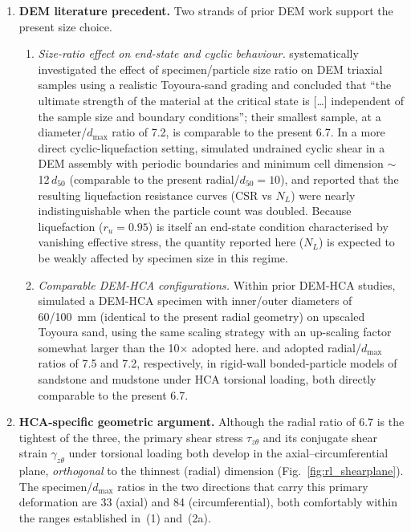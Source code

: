 \documentclass[11pt,a4paper]{article}
\newcommand{\ru}{\ensuremath{r_u}}
\begin{document}
\begin{enumerate}[leftmargin=*,label=(\arabic*)]
  \item \textbf{DEM literature precedent.} Two strands of prior DEM
    work support the present size choice.
    \begin{enumerate}[label=(\alph*), leftmargin=2em, topsep=2pt, itemsep=3pt]
    \item \textit{Size-ratio effect on end-state and cyclic
      behaviour.} \citet{Huang2014} systematically investigated
      the effect of specimen/particle size ratio on DEM triaxial
      samples using a realistic Toyoura-sand grading and concluded
      that ``the ultimate strength of the material at the critical
      state is [\ldots] independent of the sample size and
      boundary conditions''; their smallest sample, at a
      diameter/$d_{\max}$ ratio of 7.2, is comparable to the
      present 6.7. In a more direct cyclic-liquefaction setting,
      \citet{KuhnRenken2014} simulated undrained cyclic shear in a
      DEM assembly with periodic boundaries and minimum cell
      dimension $\sim$12\,$d_{50}$ (comparable to the present
      radial/$d_{50}=10$), and reported that the resulting
      liquefaction resistance curves ($\mathrm{CSR}$ vs $N_L$) were
      nearly indistinguishable when the particle count was doubled.
      Because liquefaction ($\ru=0.95$) is itself an end-state
      condition characterised by vanishing effective stress, the
      quantity reported here ($N_L$) is expected to be weakly
      affected by specimen size in this regime.
    \item \textit{Comparable DEM-HCA configurations.} Within prior
      DEM-HCA studies, \citet{Song2024} simulated a DEM-HCA specimen
      with inner/outer diameters of 60/100~mm (identical to the
      present radial geometry) on upscaled Toyoura sand, using the
      same scaling strategy with an up-scaling factor somewhat
      larger than the 10$\times$ adopted here. \citet{Shi2021} and
      \citet{Liu2021} adopted radial/$d_{\max}$ ratios of 7.5 and
      7.2, respectively, in rigid-wall bonded-particle models of
      sandstone and mudstone under HCA torsional loading, both
      directly comparable to the present 6.7.
    \end{enumerate}

  \item \textbf{HCA-specific geometric argument.} Although the
    radial ratio of 6.7 is the tightest of the three, the primary
    shear stress $\tau_{z\theta}$ and its conjugate shear strain
    $\gamma_{z\theta}$ under torsional loading both develop in the
    axial--circumferential plane, \emph{orthogonal} to the thinnest
    (radial) dimension (Fig.~\ref{fig:rl_shearplane}). The specimen/$d_{\max}$
    ratios in the two directions that carry this primary
    deformation are 33 (axial) and 84 (circumferential), both
    comfortably within the ranges established in~(1) and~(2a).


\end{enumerate}
\end{document}
